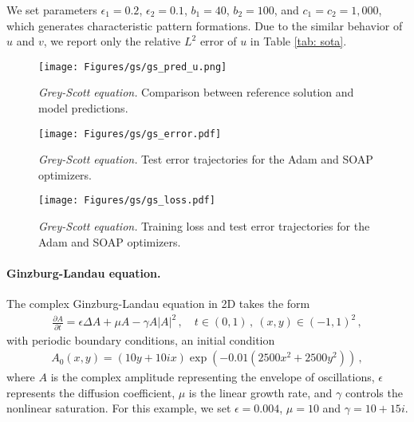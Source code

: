 We set parameters $\epsilon_1=0.2$, $\epsilon_2=0.1$, $b_1=40$, $b_2=100$, and $c_1=c_2=1,000$, which generates characteristic pattern formations. Due to the similar behavior of $u$ and $v$, we report only the relative $L^2$ error of $u$ in Table \ref{tab: sota}.



\begin{figure}
    \centering
    \texttt{[image: Figures/gs/gs\_pred\_u.png]}
\caption{{\em Grey-Scott equation.} Comparison between reference solution and model predictions.}
    \label{fig:gs_pred_u}
\end{figure}


\begin{figure}
    \centering
    \texttt{[image: Figures/gs/gs\_error.pdf]}
\caption{{\em Grey-Scott equation.} Test error trajectories for the Adam and SOAP optimizers.}
    \label{fig:gs_error}
\end{figure}

\begin{figure}
    \centering
    \texttt{[image: Figures/gs/gs\_loss.pdf]}
\caption{{\em Grey-Scott equation.} Training loss and test error trajectories for the Adam and SOAP optimizers.}
    \label{fig:gs_loss}
\end{figure}


\paragraph{Ginzburg-Landau equation.} The complex Ginzburg-Landau equation in 2D takes the form
\begin{align*}
    \frac{\partial A}{\partial t}= \epsilon \Delta A + \mu A - \gamma  A|A|^2\,, \quad t \in (0, 1)\,,
    \ (x, y) \in (-1, 1)^2\,,
\end{align*}
with periodic boundary conditions, an initial condition
\begin{align*}
    A_0(x, y) = (10y + 10 i  x) \exp\left(-0.01 (2500 x^2 + 2500 y^2)\right)\,,
\end{align*}
where  $A$ is the complex amplitude representing the envelope of oscillations, $\epsilon$ represents the diffusion coefficient, $\mu$ is the linear growth rate, and $\gamma$ controls the nonlinear saturation. For this example, we set $\epsilon=0.004$, $\mu = 10$ and $\gamma= 10 + 15i$.


